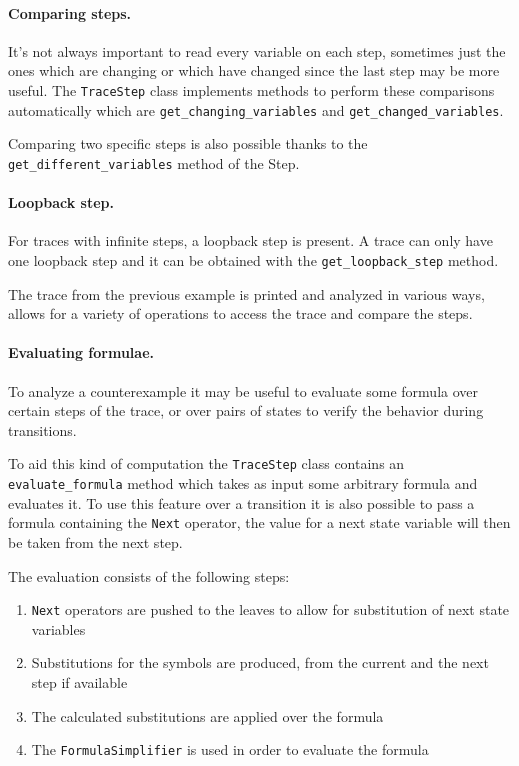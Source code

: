 \paragraph*{Comparing steps.}
It's not always important to read every variable on each step, sometimes just the ones which are changing or which have changed since the last step may be more useful.
The \texttt{TraceStep} class implements methods to perform these comparisons automatically which are \texttt{get\_changing\_variables} and \texttt{get\_changed\_variables}.

Comparing two specific steps is also possible thanks to the \texttt{get\_different\_variables} method of the Step.

\paragraph*{Loopback step.}
For traces with infinite steps, a loopback step is present. A trace can only have one loopback step and it can be obtained with the \texttt{get\_loopback\_step} method.

\begin{listing}
    \label{alg:model-checking-traces}
    \caption{The trace from the previous example is printed and analyzed in various ways, \pyvmt{} allows for a variety of operations to access the trace and compare the steps.}
\end{listing}

\paragraph*{Evaluating formulae.}
To analyze a counterexample it may be useful to evaluate some formula over certain steps of the trace, or over pairs of states to verify the behavior during transitions.

To aid this kind of computation the \texttt{TraceStep} class contains an \texttt{evaluate\_formula} method which takes as input some arbitrary \pysmt{} formula and evaluates it.
To use this feature over a transition it is also possible to pass a formula containing the \texttt{Next} operator, the value for a next state variable will then be taken from the next step.

The evaluation consists of the following steps:
\begin{enumerate}
    \item \texttt{Next} operators are pushed to the leaves to allow for substitution of next state variables
    \item Substitutions for the symbols are produced, from the current and the next step if available
    \item The calculated substitutions are applied over the formula
    \item The \texttt{FormulaSimplifier} is used in order to evaluate the formula
\end{enumerate}

